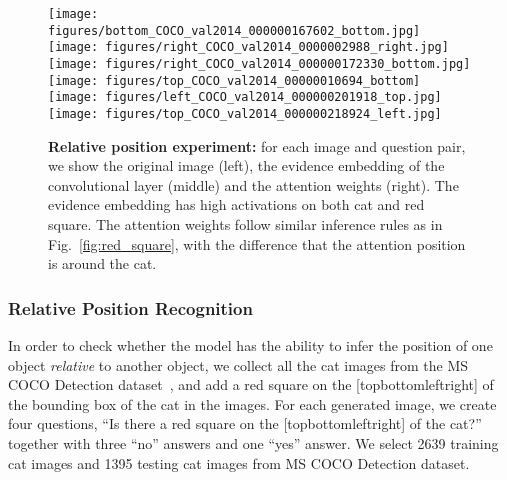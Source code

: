 \begin{figure*}[t]
  \texttt{[image: figures/bottom\_COCO\_val2014\_000000167602\_bottom.jpg]}
  \texttt{[image: figures/right\_COCO\_val2014\_0000002988\_right.jpg]}
  \texttt{[image: figures/right\_COCO\_val2014\_000000172330\_bottom.jpg]}\\
  \texttt{[image: figures/top\_COCO\_val2014\_00000010694\_bottom]}
  \texttt{[image: figures/left\_COCO\_val2014\_000000201918\_top.jpg]}
  \texttt{[image: figures/top\_COCO\_val2014\_000000218924\_left.jpg]}
\vspace{-0.05in}
\caption{\textbf{Relative position experiment:}
for each image and question pair, we show the original image (left), the evidence embedding  of the convolutional layer (middle) and the attention weights  (right). The evidence embedding  has high activations on both cat and red square. 
The attention weights follow similar inference rules as in Fig.~\ref{fig:red_square}, with the difference that the attention position is around the cat.
}\label{fig:cat_square}
\vspace{-0.2in}
\end{figure*}


\vspace{-0.1in}
\subsubsection{Relative Position Recognition}
In order to check whether the model has the ability to infer the  position of one object \textit{relative} to another object,
we collect all the cat images from the MS COCO Detection dataset~\cite{lin2014microsoft}, and add a red square on the [topbottomleftright] of the bounding box of the cat in the images.
For each generated image, we create four questions, ``Is there a red square on the [topbottomleftright] of the cat?'' together with three ``no'' answers and one ``yes'' answer. 
We select 2639 training cat images and 1395 testing cat images from MS COCO Detection dataset. 

